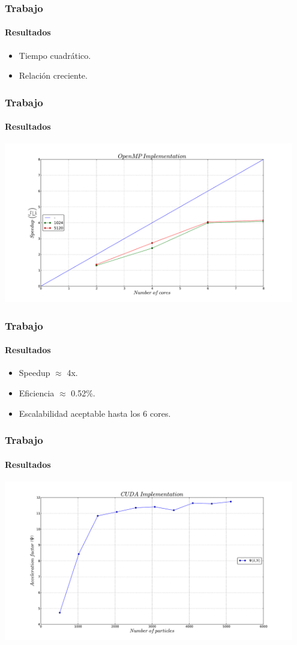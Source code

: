 \frame
{
\frametitle{Trabajo}
\framesubtitle{Resultados }
\begin{itemize}
	\item Tiempo cuadrático.
	\item Relación creciente.
\end{itemize}
}


\frame
{
\frametitle{Trabajo}
\framesubtitle{Resultados }
\begin{center}
	\includegraphics[width=0.95\textwidth]{img/openmp_speedup.pdf}
\end{center}
}

\frame
{
\frametitle{Trabajo}
\framesubtitle{Resultados }
\begin{itemize}
	\item Speedup $\approx$ 4x.
	\item Eficiencia $\approx$ 0.52\%.
	\item Escalabilidad aceptable hasta los 6 cores.
\end{itemize}
}

\frame
{
\frametitle{Trabajo}
\framesubtitle{Resultados }
\begin{center}
	\includegraphics[width=0.95\textwidth]{img/cuda_speedup.pdf}
\end{center}
}

